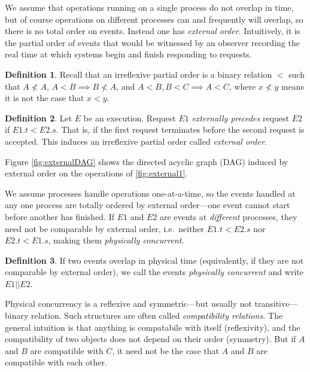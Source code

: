 \documentclass[]             %
{NASA}                       %
\theoremstyle{definition}
\newtheorem{definition}{Definition}[section]
\begin{document}
\afterpage{\clearpage}

We assume that operations running on a single process do not overlap
in time, but of course operations on different processes can and
frequently will overlap, so there is no total order on events. Instead
one has \emph{external order}.  Intuitively, it is the partial order
of events that would be witnessed by an observer recording the real
time at which systems begin and finish responding to requests.

\begin{definition}
  Recall that an irreflexive partial order is a binary relation \(<\)
  such that \(A \not < A\), \(A < B \implies B \not < A\), and \(A <
  B, B < C \implies A < C\), where $x \not < y$ means it is not the
  case that $x < y$.
\end{definition}

\begin{definition}
  Let $E$ be an execution. Request $E1$ \emph{externally precedes}
  request $E2$ if $E1.t < E2.s$. That is, if the first request
  terminates before the second request is accepted. This induces an
  irreflexive partial order called \emph{external order}.
\end{definition}

Figure \ref{fig:externalDAG} shows the directed acyclic graph (DAG)
induced by external order on the operations of \ref{fig:external1}.

We assume processes handle operations one-at-a-time, so the events
handled at any one process are totally ordered by external order---one
event cannot start before another has finished. If \(E1\) and \(E2\)
are events at \emph{different} processes, they need not be comparable
by external order, i.e.~neither \(E1.t < E2.s\) nor \(E2.t < E1.s\),
making them \emph{physically concurrent}.
\begin{definition}
  If two events overlap in physical time (equivalently, if they are
  not comparable by external order), we call the events
  \emph{physically concurrent} and write $E1 || E2$.
\end{definition}
Physical concurrency is a reflexive and symmetric---but usually not
transitive--- binary relation. Such structures are often called
\emph{compatibility relations.} The general intuition is that anything
is compatabile with itself (reflexivity), and the compatibility of two
objects does not depend on their order (symmetry). But if \(A\) and
\(B\) are compatible with \(C\), it need not be the case that \(A\)
and \(B\) are compatible with each other.
\end{document}

